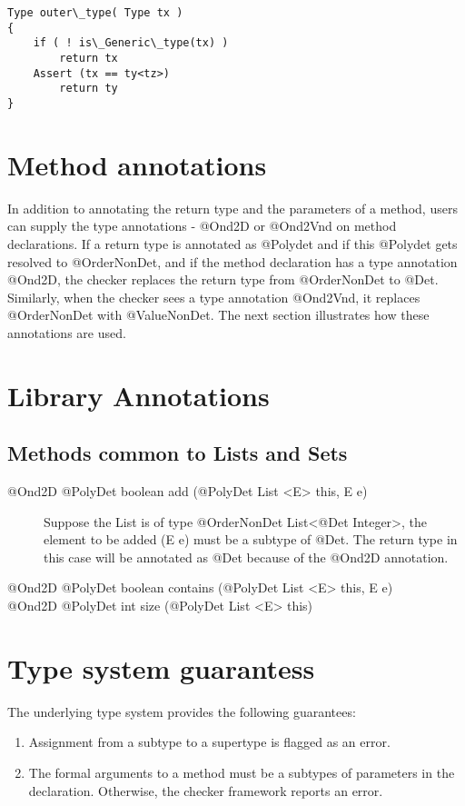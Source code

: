 

\begin{verbatim}
Type outer\_type( Type tx )
{
    if ( ! is\_Generic\_type(tx) )
        return tx
    Assert (tx == ty<tz>)
        return ty
}
\end{verbatim}

\section{Method annotations\label{method-annotations}}
In addition to annotating the return type and the parameters of a method, users can supply the type annotations -
@Ond2D or @Ond2Vnd on method declarations.
If a return type is annotated as @Polydet and if this @Polydet gets resolved to @OrderNonDet, and if the method declaration has a type annotation @Ond2D,
the checker replaces the return type from @OrderNonDet to @Det. Similarly, when the checker sees a type annotation @Ond2Vnd, it
replaces @OrderNonDet with @ValueNonDet. The next section illustrates how these annotations are used.

\section{Library Annotations\label{library-Annotations}}
\subsection{Methods common to Lists and Sets\label{lib-methods}}
\begin{description}
	\item[@Ond2D @PolyDet  boolean add (@PolyDet List <E> this, E e)] Suppose the List is of
	type @OrderNonDet List<@Det Integer>, the element to be added (E e) must be a subtype of @Det.
	The return type in this case will be annotated as @Det because of the @Ond2D annotation.
	\item[@Ond2D @PolyDet  boolean contains (@PolyDet List <E> this, E e)]
	\item[@Ond2D @PolyDet int size (@PolyDet List <E> this)]
\end{description}

\section{Type system guarantess\label{type-system-guarantees}}
The underlying type system provides the following guarantees:
\begin{enumerate}
	\item Assignment from a subtype to a supertype is flagged as an error.
	\item The formal arguments to a method must be a subtypes of parameters in the declaration. Otherwise, the checker framework reports an error.
\end{enumerate}

